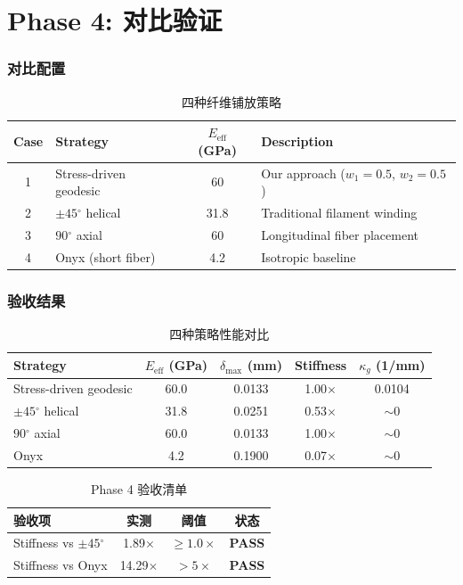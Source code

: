\documentclass[11pt,a4paper]{article}
\begin{document}
\newpage
\part{Phase 4: 对比验证}

\section{对比配置}

\begin{table}[H]
\centering
\begin{tabularx}{\textwidth}{c l c X}
\toprule
\textbf{Case} & \textbf{Strategy} & $E_{\text{eff}}$ (GPa) & \textbf{Description} \\
\midrule
1 & Stress-driven geodesic & 60 & Our approach ($w_1 = 0.5$, $w_2 = 0.5$) \\
2 & $\pm 45$$^\circ$ helical & 31.8 & Traditional filament winding \\
3 & $90$$^\circ$ axial & 60 & Longitudinal fiber placement \\
4 & Onyx (short fiber) & 4.2 & Isotropic baseline \\
\bottomrule
\end{tabularx}
\caption{四种纤维铺放策略}
\end{table}

\section{验收结果}

\begin{table}[H]
\centering
\begin{tabular}{l c c c c}
\toprule
\textbf{Strategy} & $E_{\text{eff}}$ (GPa) & $\delta_{\max}$ (mm) & \textbf{Stiffness} & $\kappa_g$ (1/mm) \\
\midrule
Stress-driven geodesic & 60.0 & 0.0133 & 1.00$\times$ & 0.0104 \\
$\pm 45$$^\circ$ helical & 31.8 & 0.0251 & 0.53$\times$ & $\sim$0 \\
$90$$^\circ$ axial & 60.0 & 0.0133 & 1.00$\times$ & $\sim$0 \\
Onyx & 4.2 & 0.1900 & 0.07$\times$ & $\sim$0 \\
\bottomrule
\end{tabular}
\caption{四种策略性能对比}
\end{table}

\begin{table}[H]
\centering
\begin{tabularx}{\textwidth}{X c c c}
\toprule
\textbf{验收项} & \textbf{实测} & \textbf{阈值} & \textbf{状态} \\
\midrule
Stiffness vs $\pm 45$$^\circ$ & 1.89$\times$ & $\geq 1.0\times$ & \textcolor{pass}{\textbf{PASS}} \\
Stiffness vs Onyx & 14.29$\times$ & $> 5\times$ & \textcolor{pass}{\textbf{PASS}} \\
\bottomrule
\end{tabularx}
\caption{Phase 4 验收清单}
\end{table}
\end{document}
